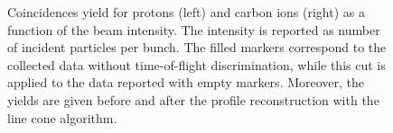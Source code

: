\begin{figure} [!h]
  \caption{Coincidences yield for protons (left) and carbon ions (right) as a function of the beam intensity. The intensity is reported as number of incident particles per bunch. The filled markers correspond to the collected data without time-of-flight discrimination, while this cut is applied to the data reported with empty markers. Moreover, the yields are given before and after the profile reconstruction with the line cone algorithm.}
  \label{fig:coincidences}
\end{figure}

